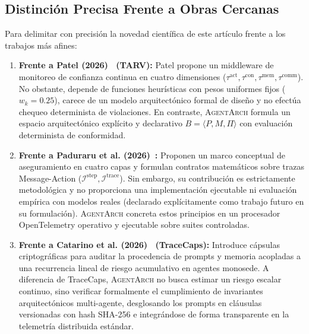 \documentclass[conference]{IEEEtran}
\begin{document}
\subsection{Distinci\'on Precisa Frente a Obras Cercanas}
Para delimitar con precisi\'on la novedad cient\'ifica de este art\'iculo frente a los trabajos m\'as afines:
\begin{enumerate}
    \item \textbf{Frente a Patel (2026)~\cite{patel2026} (TARV):} Patel propone un middleware de monitoreo de confianza continua en cuatro dimensiones ($\tau^{\text{act}}, \tau^{\text{con}}, \tau^{\text{mem}}, \tau^{\text{comm}}$). No obstante, depende de funciones heur\'isticas con pesos uniformes fijos ($w_k = 0.25$), carece de un modelo arquitect\'onico formal de dise\~no y no efect\'ua chequeo determinista de violaciones. En contraste, \textsc{AgentArch} formula un espacio arquitect\'onico expl\'icito y declarativo $B = \langle P, M, \Pi \rangle$ con evaluaci\'on determinista de conformidad.
    \item \textbf{Frente a Paduraru et al. (2026)~\cite{paduraru2026}:} Proponen un marco conceptual de aseguramiento en cuatro capas y formulan contratos matem\'aticos sobre trazas Message-Action ($\mathcal{I}^{\text{step}}, \mathcal{I}^{\text{trace}}$). Sin embargo, su contribuci\'on es estrictamente metodol\'ogica y no proporciona una implementaci\'on ejecutable ni evaluaci\'on emp\'irica con modelos reales (declarado expl\'icitamente como trabajo futuro en su formulaci\'on). \textsc{AgentArch} concreta estos principios en un procesador OpenTelemetry operativo y ejecutable sobre suites controladas.
    \item \textbf{Frente a Catarino et al. (2026)~\cite{catarino2026} (TraceCaps):} Introduce c\'apsulas criptogr\'aficas para auditar la procedencia de prompts y memoria acopladas a una recurrencia lineal de riesgo acumulativo en agentes monosede. A diferencia de TraceCaps, \textsc{AgentArch} no busca estimar un riesgo escalar continuo, sino verificar formalmente el cumplimiento de invariantes arquitect\'onicos multi-agente, desglosando los prompts en cl\'ausulas versionadas con hash SHA-256 e integr\'andose de forma transparente en la telemetr\'ia distribuida est\'andar.
\end{enumerate}
\end{document}
